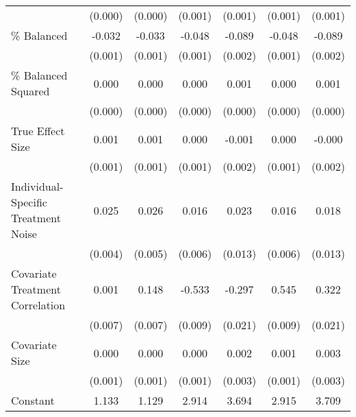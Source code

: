 \begin{table}[htbp]
\begin{tabular}{l*{6}{c}}
                    &     (0.000)         &     (0.000)         &     (0.001)         &     (0.001)         &     (0.001)         &     (0.001)         \\
\% Balanced         &      -0.032\sym{***}&      -0.033\sym{***}&      -0.048\sym{***}&      -0.089\sym{***}&      -0.048\sym{***}&      -0.089\sym{***}\\
                    &     (0.001)         &     (0.001)         &     (0.001)         &     (0.002)         &     (0.001)         &     (0.002)         \\
\% Balanced Squared &       0.000\sym{***}&       0.000\sym{***}&       0.000\sym{***}&       0.001\sym{***}&       0.000\sym{***}&       0.001\sym{***}\\
                    &     (0.000)         &     (0.000)         &     (0.000)         &     (0.000)         &     (0.000)         &     (0.000)         \\
True Effect Size    &       0.001         &       0.001\sym{*}  &       0.000         &      -0.001         &       0.000         &      -0.000         \\
                    &     (0.001)         &     (0.001)         &     (0.001)         &     (0.002)         &     (0.001)         &     (0.002)         \\
Individual-Specific Treatment Noise&       0.025\sym{***}&       0.026\sym{***}&       0.016\sym{**} &       0.023         &       0.016\sym{**} &       0.018         \\
                    &     (0.004)         &     (0.005)         &     (0.006)         &     (0.013)         &     (0.006)         &     (0.013)         \\
Covariate Treatment Correlation&       0.001         &       0.148\sym{***}&      -0.533\sym{***}&      -0.297\sym{***}&       0.545\sym{***}&       0.322\sym{***}\\
                    &     (0.007)         &     (0.007)         &     (0.009)         &     (0.021)         &     (0.009)         &     (0.021)         \\
Covariate Size      &       0.000         &       0.000         &       0.000         &       0.002         &       0.001         &       0.003         \\
                    &     (0.001)         &     (0.001)         &     (0.001)         &     (0.003)         &     (0.001)         &     (0.003)         \\
Constant            &       1.133\sym{***}&       1.129\sym{***}&       2.914\sym{***}&       3.694\sym{***}&       2.915\sym{***}&       3.709\sym{***}\\

\end{tabular}
\end{table}
